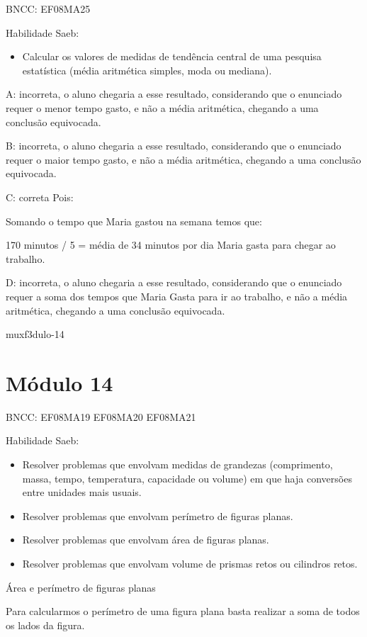 {BNCC: EF08MA25

Habilidade Saeb:

\begin{itemize}
\tightlist
\item
  Calcular os valores de medidas de tendência central de uma pesquisa
  estatística (média aritmética simples, moda ou mediana).
\end{itemize}

A: incorreta, o aluno chegaria a esse resultado, considerando que o
enunciado requer o menor tempo gasto, e não a média aritmética, chegando
a uma conclusão equivocada.

B: incorreta, o aluno chegaria a esse resultado, considerando que o
enunciado requer o maior tempo gasto, e não a média aritmética, chegando
a uma conclusão equivocada.

C: correta Pois:

Somando o tempo que Maria gastou na semana temos que:

170 minutos / 5 = média de 34 minutos por dia Maria gasta para chegar ao
trabalho.

D: incorreta, o aluno chegaria a esse resultado, considerando que o
enunciado requer a soma dos tempos que Maria Gasta para ir ao trabalho,
e não a média aritmética, chegando a uma conclusão equivocada.

muxf3dulo-14}{%
\section{Módulo 14}

BNCC: EF08MA19 EF08MA20 EF08MA21

Habilidade Saeb:

\begin{itemize}
\item
  Resolver problemas que envolvam medidas de grandezas (comprimento,
  massa, tempo, temperatura, capacidade ou volume) em que haja
  conversões entre unidades mais usuais.
\item
  Resolver problemas que envolvam perímetro de figuras planas.
\item
  Resolver problemas que envolvam área de figuras planas.
\item
  Resolver problemas que envolvam volume de prismas retos ou cilindros
  retos.
\end{itemize}

Área e perímetro de figuras planas

Para calcularmos o perímetro de uma figura plana basta realizar a soma
de todos os lados da figura.

}
